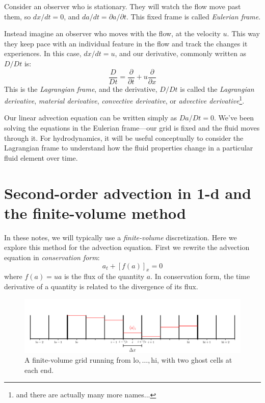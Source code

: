 Consider an observer who is stationary.  They will watch the flow move
past them, so $dx/dt = 0$, and $da/dt = \partial a/\partial t$.  
This fixed frame is called {\em Eulerian frame}.

Instead imagine an observer who moves with the flow, at the velocity $u$.
This way they keep pace with an individual feature in the flow and track
the changes it experiences.  In this case, $dx/dt = u$, and our derivative,
commonly written as $D/Dt$ is:
\begin{equation}
\frac{D}{Dt} = \frac{\partial}{\partial t} + u \frac{\partial}{\partial x}
\end{equation}
This is the {\em Lagrangian frame}, and the derivative, $D/Dt$ is
called the {\em Lagrangian derivative}, {\em material derivative},
{\em convective derivative}, or {\em advective
derivative}\footnote{and there are actually many more names...}.

Our linear advection equation can be written simply as $Da/Dt = 0$.
We've been solving the equations in the Eulerian frame---our grid is
fixed and the fluid moves through it.  For hydrodynamics, it will be
useful conceptually to consider the Lagrangian frame to understand how
the fluid properties change in a particular fluid element over time.


\section{Second-order advection in 1-d and the finite-volume method}

\label{ch:adv:sndorder}

In these notes, we will typically use a {\em finite-volume} discretization.  Here we 
explore this method for the 
advection equation.  First we rewrite the advection equation in {\em
  conservation form}:
\begin{equation}
a_t + \left[f(a)\right]_x = 0
\label{eq:advect-cons}
\end{equation}
where $f(a) = ua$ is the flux of the quantity $a$.  In conservation form,
the time derivative of a quantity is related to the divergence of 
its flux.

\begin{figure}[t]
\centering
\includegraphics[width=\linewidth]{fv_ghost}
\caption[A finite-volume grid with valid cells
  labeled]{\label{fig:fvghost} A finite-volume grid running from
  $\mathrm{lo}, \ldots, \mathrm{hi}$, with two ghost cells at each
  end.}
\end{figure}

